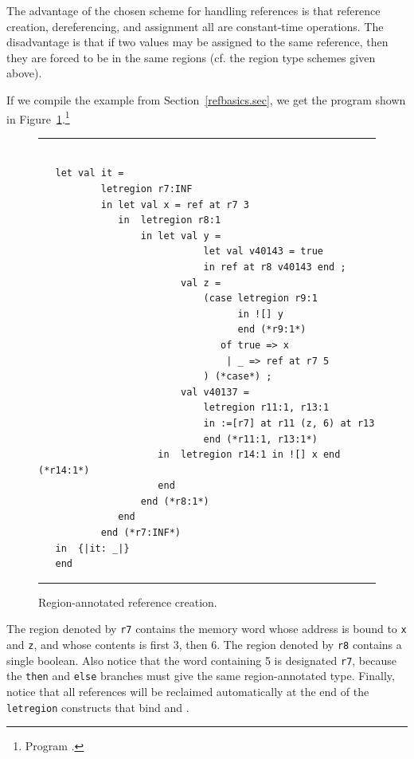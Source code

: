 \documentclass[12pt]{book}
\begin{document}
The advantage of the chosen scheme for handling references is that
reference creation, dereferencing, and assignment all are constant-time
operations. The disadvantage is that if two values may be
assigned to the same reference, then they are forced to be in the same regions (cf. the
region type schemes given above). 

If we compile the example from Section~\ref{refbasics.sec}, we get the 
program shown in Figure~\ref{otherrefs.fig}.\footnote{Program .}
\begin{figure}
\hrule
\begin{verbatim}

   let val it = 
           letregion r7:INF 
           in let val x = ref at r7 3
              in  letregion r8:1 
                  in let val y = 
                             let val v40143 = true 
                             in ref at r8 v40143 end ; 
                         val z = 
                             (case letregion r9:1 
                                   in ![] y 
                                   end (*r9:1*) 
                                of true => x 
                                 | _ => ref at r7 5
                             ) (*case*) ; 
                         val v40137 = 
                             letregion r11:1, r13:1 
                             in :=[r7] at r11 (z, 6) at r13 
                             end (*r11:1, r13:1*)
                     in  letregion r14:1 in ![] x end (*r14:1*)
                     end  
                  end (*r8:1*)
              end  
           end (*r7:INF*)
   in  {|it: _|}
   end 
\end{verbatim}
\caption{Region-annotated reference creation.}
\label{otherrefs.fig}
\medskip
\hrule
\end{figure}
The region denoted by {\tt r7} contains the memory 
word whose address is bound to {\tt x} and {\tt z},
and whose contents is first 3, then 6.  The region denoted
by {\tt r8} contains a single boolean.
Also notice that the word containing 5 is
designated {\tt r7}, 
because the {\tt then} and {\tt else} branches must give the same
region-annotated type. Finally, notice that all 
references will be reclaimed automatically
at the end of the {\tt letregion} constructs 
that bind  and .
\end{document}
